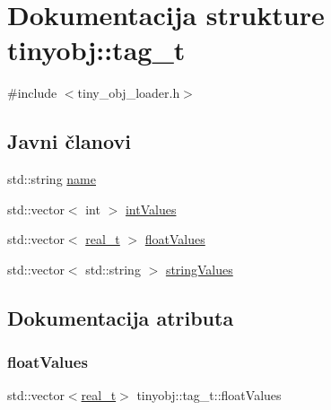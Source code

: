 \hypertarget{structtinyobj_1_1tag__t}{}\section{Dokumentacija strukture tinyobj\+:\+:tag\+\_\+t}
\label{structtinyobj_1_1tag__t}


{\ttfamily \#include $<$tiny\+\_\+obj\+\_\+loader.\+h$>$}

\subsection*{Javni članovi}
\begin{DoxyCompactItemize}
\item 
std\+::string \hyperlink{structtinyobj_1_1tag__t_a9b3650154d2fbd83dad945ebcf6bd448}{name}
\item 
std\+::vector$<$ int $>$ \hyperlink{structtinyobj_1_1tag__t_adc6a6682263abaa11e3ec62b910bb80d}{int\+Values}
\item 
std\+::vector$<$ \hyperlink{namespacetinyobj_ad5ca7469ff56bf0d8423120cfd99adce}{real\+\_\+t} $>$ \hyperlink{structtinyobj_1_1tag__t_a6e531cc0a0d53b6334cf55da4bb62ffc}{float\+Values}
\item 
std\+::vector$<$ std\+::string $>$ \hyperlink{structtinyobj_1_1tag__t_a25634eea923961fd5b2520ea782397e8}{string\+Values}
\end{DoxyCompactItemize}


\subsection{Dokumentacija atributa}
\mbox{\label{structtinyobj_1_1tag__t_a6e531cc0a0d53b6334cf55da4bb62ffc}} 
\subsubsection{\texorpdfstring{float\+Values}{floatValues}}
{\footnotesize\ttfamily std\+::vector$<$\hyperlink{namespacetinyobj_ad5ca7469ff56bf0d8423120cfd99adce}{real\+\_\+t}$>$ tinyobj\+::tag\+\_\+t\+::float\+Values}

\mbox{\label{structtinyobj_1_1tag__t_adc6a6682263abaa11e3ec62b910bb80d}} 
